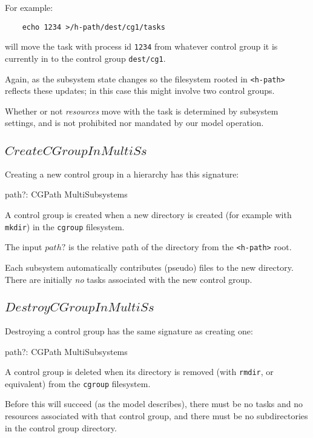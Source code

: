 \documentclass[a4paper,twoside,12pt]{article}
\begin{document}
For example:
\begin{verbatim}
    echo 1234 >/h-path/dest/cg1/tasks
\end{verbatim}
will move the task with process id \texttt{1234} from whatever control group it is currently in to 
the control group \texttt{dest/cg1}.

Again, as the subsystem state changes so the
filesystem rooted in \texttt{<h-path>} reflects these updates; in this case this might involve two control groups.

Whether or not \emph{resources} move with the task is determined by subsystem settings, and is not
prohibited nor mandated by our model operation.

\subsection{$CreateCGroupInMultiSs$}

Creating a new control group in a hierarchy has this signature:
\begin{schema*}
    path?: CGPath
\also 
    \Delta MultiSubsystems
\end{schema*}
A control group is created when a new directory is created (for example with \texttt{mkdir}) 
in the \texttt{cgroup} filesystem.

The input $path?$ is the relative path of the directory from the \texttt{<h-path>} root.

Each subsystem automatically contributes
(pseudo) files to the new directory. There are initially \emph{no} tasks associated with the new control group.

\subsection{$DestroyCGroupInMultiSs$}

Destroying a control group has the same signature as creating one:
\begin{schema*}
    path?: CGPath
\also 
    \Delta MultiSubsystems
\end{schema*}
A control group is deleted when its directory is removed (with \texttt{rmdir}, or equivalent) from the 
\texttt{cgroup} filesystem.

Before this will succeed (as the model describes), there must be no tasks and no resources 
associated with that control group,
and there must be no subdirectories in the control group directory.
\end{document}
